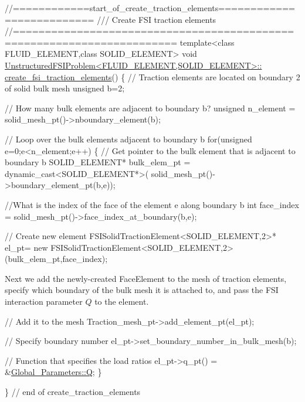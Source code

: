 \begin{DoxyCodeInclude}
\textcolor{comment}{//============start\_of\_create\_traction\_elements==========================}
\textcolor{comment}{/// Create FSI traction elements }
\textcolor{comment}{}\textcolor{comment}{//=======================================================================}
\textcolor{keyword}{template}<\textcolor{keyword}{class} FLUID\_ELEMENT,\textcolor{keyword}{class} SOLID\_ELEMENT>
\textcolor{keywordtype}{void} \hyperlink{classUnstructuredFSIProblem_a934a587c99668fca969a72814b3142a7}{UnstructuredFSIProblem<FLUID\_ELEMENT,SOLID\_ELEMENT>::}
\hyperlink{classUnstructuredFSIProblem_a934a587c99668fca969a72814b3142a7}{create\_fsi\_traction\_elements}()
\{
 \textcolor{comment}{// Traction elements are located on boundary 2 of solid bulk mesh}
 \textcolor{keywordtype}{unsigned} b=2;
 
 \textcolor{comment}{// How many bulk elements are adjacent to boundary b?}
 \textcolor{keywordtype}{unsigned} n\_element = solid\_mesh\_pt()->nboundary\_element(b);
 
 \textcolor{comment}{// Loop over the bulk elements adjacent to boundary b}
 \textcolor{keywordflow}{for}(\textcolor{keywordtype}{unsigned} e=0;e<n\_element;e++)
  \{
   \textcolor{comment}{// Get pointer to the bulk element that is adjacent to boundary b}
   SOLID\_ELEMENT* bulk\_elem\_pt = \textcolor{keyword}{dynamic\_cast<}SOLID\_ELEMENT*\textcolor{keyword}{>}(
    solid\_mesh\_pt()->boundary\_element\_pt(b,e));
   
   \textcolor{comment}{//What is the index of the face of the element e along boundary b}
   \textcolor{keywordtype}{int} face\_index = solid\_mesh\_pt()->face\_index\_at\_boundary(b,e);
  
   \textcolor{comment}{// Create new element }
   FSISolidTractionElement<SOLID\_ELEMENT,2>* el\_pt=
    \textcolor{keyword}{new} FSISolidTractionElement<SOLID\_ELEMENT,2>(bulk\_elem\_pt,face\_index);

\end{DoxyCodeInclude}


Next we add the newly-\/created {\ttfamily Face\+Element} to the mesh of traction elements, specify which boundary of the bulk mesh it is attached to, and pass the F\+SI interaction parameter $ Q $ to the element.


\begin{DoxyCodeInclude}
   
   \textcolor{comment}{// Add it to the mesh}
   Traction\_mesh\_pt->add\_element\_pt(el\_pt);
   
   \textcolor{comment}{// Specify boundary number}
   el\_pt->set\_boundary\_number\_in\_bulk\_mesh(b);
   
   \textcolor{comment}{// Function that specifies the load ratios}
   el\_pt->q\_pt() = &\hyperlink{namespaceGlobal__Parameters_a7814fddf663e56168174a42d2cd6b4c1}{Global\_Parameters::Q}; 
  \} 

 \} \textcolor{comment}{// end of create\_traction\_elements}

\end{DoxyCodeInclude}




